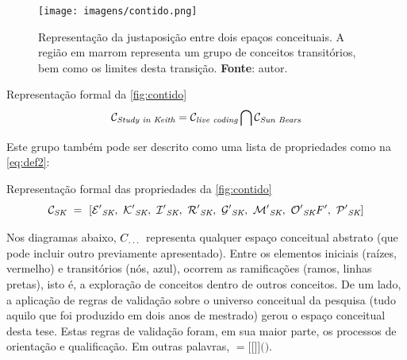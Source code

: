 \begin{figure}[!h]
  \centering
  \texttt{[image: imagens/contido.png]}
  \caption{Representação da justaposição  entre dois epaços conceituais. A região em marrom representa um grupo de conceitos transitórios, bem como os limites desta transição. \textbf{Fonte}: autor. }
  \label{fig:contido}
\end{figure}

\begin{example}{Representação formal da \autoref{fig:contido}}
\begin{equation}
\mathcal{C}_\emph{Study in Keith} = \mathcal{C}_\emph{live coding} \bigcap \mathcal{C}_\emph{Sun Bears}
\label{eq:def}
\end{equation}
\end{example}

Este grupo também pode ser descrito como uma lista de propriedades como na \autoref{eq:def2}:

\begin{example}{Representação formal das propriedades da \autoref{fig:contido}}
\begin{equation}
\mathcal{C}_\emph{SK}~=~[\mathcal{E'}_\emph{SK},~\mathcal{K'}_\emph{SK},~\mathcal{I'}_\emph{SK},~\mathcal{R'}_\emph{SK},~\mathcal{G'}_\emph{SK},~\mathcal{M'}_\emph{SK},~\mathcal{O'}_\emph{SK}{F'},~\mathcal{P'}_\emph{SK}]
\label{eq:def2}
\end{equation}
\end{example}
  
Nos diagramas abaixo, $C_\emph{\ldots}$ representa qualquer espaço conceitual abstrato (que pode incluir outro previamente apresentado). Entre os elementos iniciais (raízes, vermelho) e transitórios (nós, azul), ocorrem as ramificações (ramos, linhas pretas), isto é, a exploração de conceitos dentro de outros conceitos. De um lado, a aplicação de regras de validação sobre o universo conceitual da pesquisa (tudo aquilo que foi produzido em dois anos de mestrado) gerou o espaço conceitual desta tese. Estas regras de validação foram, em sua maior parte, os processos de orientação e qualificação. Em outras palavras, $=[[$$]]($$)$.

